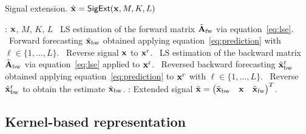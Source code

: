 \begin{algorithm}
\caption{Signal extension. $\tilde{{\mathbf x}} = \mathsf{SigExt}({\mathbf x},M,K,L)$}
\label{alg:extension}
\begin{algorithmic}
: ${\mathbf x}$, $M$, $K$, $L$
\STATE 
{}
\STATE \quad\textbullet\ LS estimation of the forward matrix $\tilde{{\mathbf A}}_{\rm fw}$ via equation~\eqref{eq:lse}.
\STATE \quad\textbullet\ Forward forecasting $\tilde{{\mathbf x}}_{\rm bw}$ obtained applying equation~\eqref{eq:prediction} with $\ell\in\{1,\ldots,L\}$.
\STATE 
{}
\STATE \quad\textbullet\ Reverse signal ${\mathbf x}$ to ${\mathbf x}^{\rm r}$. 
\STATE \quad\textbullet\ LS estimation of the backward matrix $\tilde{{\mathbf A}}_{\rm bw}$ via equation~\eqref{eq:lse} applied to ${\mathbf x}^{\rm r}$.
\STATE \quad\textbullet\ Reversed backward forecasting $\tilde{{\mathbf x}}_{\rm bw}^{\rm r}$ obtained applying equation~\eqref{eq:prediction} to ${\mathbf x}^r$ with $\ell\in\{1,\ldots,L\}$.
\STATE \quad\textbullet\ Reverse $\tilde{{\mathbf x}}_{\rm bw}^{\rm r}$ to obtain the estimate $\tilde{{\mathbf x}}_{\rm bw}$.
\STATE 
{}: Extended signal $\tilde{{\mathbf x}} = \begin{pmatrix} \tilde{{\mathbf x}}_{\rm bw}  & {\mathbf x} & \tilde{{\mathbf x}}_{\rm fw}\end{pmatrix}^T$.
\end{algorithmic}
\end{algorithm}

\subsection{Kernel-based representation}

